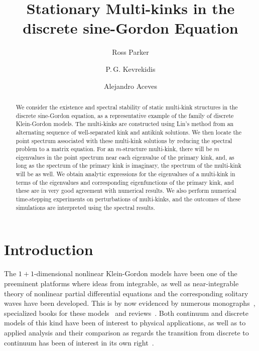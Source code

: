 \documentclass[12pt,reqno]{amsart}
\begin{document}
\title{Stationary Multi-kinks in the discrete sine-Gordon Equation}

\author{Ross Parker}
\address{Department of Mathematics, Southern Methodist University, 
Dallas, TX 75275, USA}

\author{P.\,G. Kevrekidis} 
\address{Department of Mathematics and Statistics, University of Massachusetts, Amherst MA 01003, USA}

\author{Alejandro Aceves}
\address{Department of Mathematics, Southern Methodist University, 
Dallas, TX 75275, USA}

\begin{abstract}
	We consider the existence and spectral stability of static multi-kink structures in the discrete sine-Gordon equation, as
	a representative example of the family of discrete Klein-Gordon
	models. The multi-kinks are constructed using Lin's method from an alternating sequence of well-separated kink and antikink solutions. We then locate the point spectrum associated with these multi-kink solutions by reducing the spectral problem to a matrix equation. For an $m$-structure multi-kink, there will be $m$ eigenvalues in the point spectrum near each eigenvalue of the primary kink, and, as long as the spectrum of the primary kink is imaginary, the spectrum of the multi-kink will be as well. We obtain analytic expressions for the eigenvalues of a multi-kink in terms of the eigenvalues and corresponding eigenfunctions of the primary kink, and these are in very good agreement with numerical results. We also perform numerical time-stepping experiments on perturbations of multi-kinks, and the outcomes of these simulations are interpreted using the spectral results.
\end{abstract}

\maketitle

\section{Introduction}

The $1+1$-dimensional nonlinear Klein-Gordon
models have been one of the preeminent platforms 
where ideas from integrable, as well as near-integrable 
theory of nonlinear
partial differential equations and the corresponding 
solitary waves have been developed. This
is by now evidenced by numerous monographs~\cites{eilbeck,dauxois},
specialized books for these models~\cites{braun2004,SGbook,p4book} 
and reviews~\cites{kivsharmalomed,braun1998}.
Both continuum and discrete models of this kind
have been of interest to physical applications, as well
as to applied analysis and their comparison as regards
the transition from discrete to continuum has been
of interest in its own right~\cite{SGchapter}.
\end{document}
